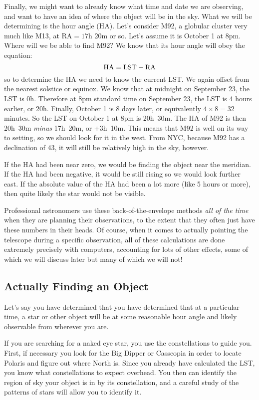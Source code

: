 \documentclass[12pt, preprint]{aastex}
\begin{document}
Finally, we might want to already know what time and date we are
observing, and want to have an idea of where the object will be in the
sky. What we will be determining is the hour angle (HA). Let's
consider M92, a globular cluster very much like M13, at RA$=17$h 20m
or so. Let's assume it is October 1 at 8pm. Where will we be able to
find M92? We know that its hour angle will obey the equation:
\begin{equation}
{\rm HA} = {\rm LST} - {\rm RA}
\end{equation}
so to determine the HA we need to know the current LST. We again
offset from the nearest solstice or equinox. We know that at midnight
on September 23, the LST is 0h. Therefore at 8pm standard time on
September 23, the LST is 4 hours earlier, or 20h. Finally, October 1
is 8 days later, or equivalently $4\times 8=32$ minutes. So the LST on
October 1 at 8pm is 20h~30m. The HA of M92 is then 20h~30m {\it minus}
17h~20m, or $+$3h~10m. This means that M92 is well on its way to
setting, so we should look for it in the west.  From NYC, because M92
has a declination of 43\degree, it will still be relatively high in
the sky, however.

If the HA had been near zero, we would be finding the object near the
meridian. If the HA had been negative, it would be still rising so we
would look further east. If the absolute value of the HA had been a
lot more (like 5 hours or more), then quite likely the star would not
be visible.

Professional astronomers use these back-of-the-envelope methods {\it
  all of the time} when they are planning their observations, to the
extent that they often just have these numbers in their heads. Of
course, when it comes to actually pointing the telescope during a
specific observation, all of these calculations are done extremely
precisely with computers, accounting for lots of other effects, some
of which we will discuss later but many of which we will not!


\subsection{Actually Finding an Object}

Let's say you have determined that you have determined that at a
particular time, a star or other object will be at some reasonable
hour angle and likely observable from wherever you are.

If you are searching for a naked eye star, you use the constellations
to guide you. First, if necessary you look for the Big Dipper or
Casseopia in order to locate Polaris and figure out where North
is. Since you already have calculated the LST, you know what
constellations to expect overhead. You then can identify the region of
sky your object is in by its constellation, and a careful study of the
patterns of stars will allow you to identify it.
\end{document}

